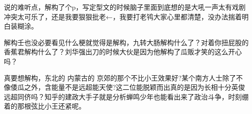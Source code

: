 \begin{zhihuanswer}
说的难听点，解构了个p，写定型文的时候脑子里面到底想的是大吼一声太有戏剧冲突太可乐了，还是我要狠狠批老←，我要打老鸨大家心里都清楚，没办法揣着明白装糊涂。

解构壬也没必要看见什么梗就觉得是解构，九转大肠解构什么了？对着你扭屁股的香蕉君解构什么了？刘华强出刀的时候大伙是因为他解构了瓜贩才笑的这么开心吗？

真要想解构，东北的 内蒙古的
京郊的那个不比小王效果好?某个南方人士除了不像倭瓜之外，含能量不是远超能天使?这二位能脱颖而出真的是因为长相十分英俊远超同侪吗？知乎的建政大手子就是分析蝉鸣少年也能看出来了政治斗争，时刻绷着的那根弦比小王还紧呢。
\end{zhihuanswer}

